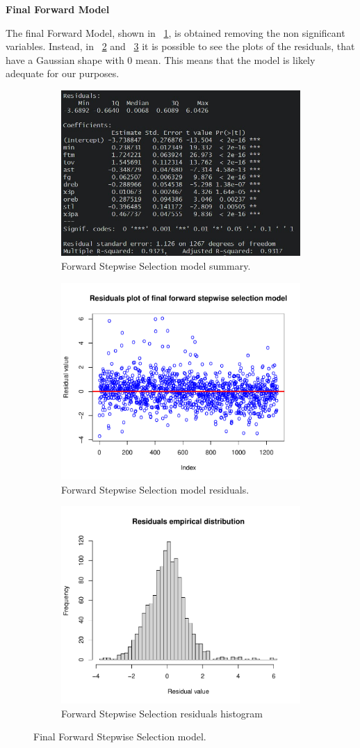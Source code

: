 \vspace{0.2cm}
\noindent
\textbf{Final Forward Model}

The final Forward Model, shown in \Fig~\ref{fig:ForwardFinalModelSummary}, is obtained removing the non significant variables. Instead, in \Fig~\ref{fig:ForwardFinalModelResiduals} and \Fig~\ref{fig:ForwardFinalModelResidualsDist} it is possible to see the plots of the residuals, that have a Gaussian shape with 0 mean. This means that the model is likely adequate for our purposes.

\begin{figure}[h]
	\centering
	\begin{subfigure}{.6\textwidth}
		\centering
		\includegraphics[width=0.5\linewidth]{ImageFiles/Regression/Forward/ForwardFinalModelSummary}
		\caption{Forward Stepwise Selection model summary.}
		\label{fig:ForwardFinalModelSummary}
	\end{subfigure}
	\begin{subfigure}{.6\textwidth}
		\centering
		\includegraphics[width=0.5\linewidth]{ImageFiles/Regression/Forward/ForwardFinalModelResiduals}
		\caption{Forward Stepwise Selection model residuals.}
		\label{fig:ForwardFinalModelResiduals}
	\end{subfigure}%
	\begin{subfigure}{.6\textwidth}
		\centering
		\includegraphics[width=0.5\linewidth]{ImageFiles/Regression/Forward/ForwardFinalModelResidualsDist}
		\caption{Forward Stepwise Selection residuals histogram}
		\label{fig:ForwardFinalModelResidualsDist}
	\end{subfigure}
	\caption{Final Forward Stepwise Selection model.}
	\label{fig:FinalFSSM}
\end{figure}

